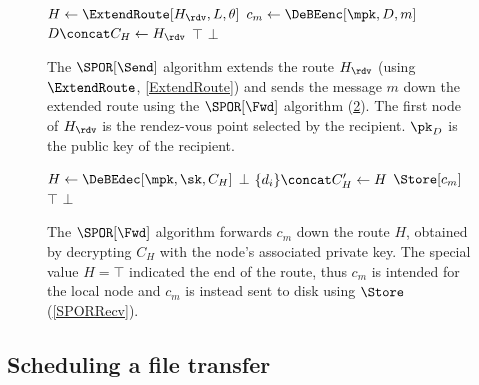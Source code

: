 \begin{figure}
  \begin{algorithmic}
      \State $H\gets \ExtendRoute[H_\rdv, L, \theta]$
      \State $c_m\gets \DeBEenc[\mpk, D, m]$
      \State $D\concat C_H\gets H_\rdv$
          \State \Return $\top$
        \EndIf
      \EndFor
      \State \Return $\bot$
    \EndFunction
  \end{algorithmic}
  \caption{\label{SPORSend}%
    The \(\SPOR[\Send]\) algorithm extends the route \(H_\rdv\) (using 
    \(\ExtendRoute\), \cref{ExtendRoute}) and sends the message \(m\) down the 
    extended route using the \(\SPOR[\Fwd]\) algorithm (\cref{SPORFwd}).
    The first node of \(H_\rdv\) is the rendez-vous point selected by the 
    recipient.
    \(\pk_D\) is the public key of the recipient.
  }
\end{figure}

\begin{figure}
  \begin{algorithmic}
      \State $H\gets \DeBEdec[\mpk, \sk, C_H]$
        \State \Return $\bot$
      \EndIf
      \State $\{d_i\}\concat C_H'\gets H$
        \State \Return $\Store[c_m]$
      \EndIf
          \State \Return $\top$
        \EndIf
      \EndFor
      \State \Return $\bot$
    \EndFunction
  \end{algorithmic}
  \caption{\label{SPORFwd}%
    The \(\SPOR[\Fwd]\) algorithm forwards \(c_m\) down the route \(H\), 
    obtained by decrypting \(C_H\) with the node's associated private key.%
    The special value \(H = \top\) indicated the end of the route, thus \(c_m\) 
    is intended for the local node and \(c_m\) is instead sent to disk using 
    \(\Store\) (\cref{SPORRecv}).%
  }
\end{figure}

\subsection{Scheduling a file transfer}

